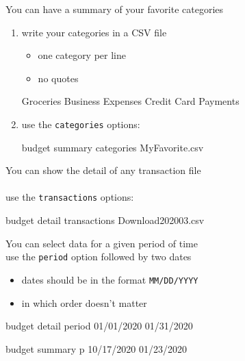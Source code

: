 \documentclass[12pt,letterpaper]{article}
\begin{document}
\begin{framed}
    \begin{minipage}[t][3in][t]{5in}
        You can have a summary of your favorite categories 
        \large
        \begin{enumerate}
            \item write your categories in a CSV file
                \begin{itemize}
                    \item one category per line
                    \item no quotes
                \end{itemize}
                \begin{budget}
                    Groceries
                    Business Expenses
                    Credit Card Payments
                \end{budget}
            \item use the \lstinline[language=budget,basicstyle=\large]!categories! options:
                \begin{budget}
                    budget summary categories MyFavorite.csv 
                \end{budget}
        \end{enumerate}
    \end{minipage}
\end{framed}
\begin{framed}
    \begin{minipage}[t][3in][t]{5in}
        \large
        You can show the detail of any transaction file\\ \\
        use the \lstinline[language=budget,basicstyle=\large]!transactions! options: \\
        \begin{budget}
            budget detail transactions Download202003.csv
        \end{budget}
    \end{minipage}
\end{framed}
\begin{framed}
    \begin{minipage}[t][3in][t]{5in}
        \Large
        You can select data for a given period of time\\

        use the \lstinline[language=budget,basicstyle=\Large]!period! option followed by two dates
        \begin{itemize}
            \item dates should be in the format \texttt{MM/DD/YYYY}
            \item in which order doesn't matter
        \end{itemize}
        \begin{budget}
            budget detail period 01/01/2020 01/31/2020

            budget summary p 10/17/2020 01/23/2020 
        \end{budget}
    \end{minipage}
\end{framed}
\end{document}
